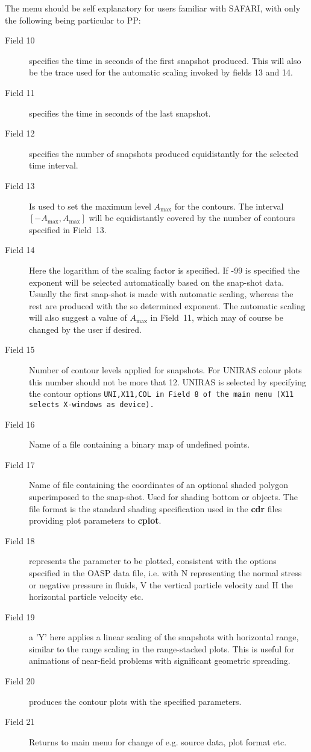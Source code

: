     The  menu should be self explanatory for users familiar  with 
SAFARI, with only the following being particular to PP: 
\begin{description}
\item[Field 10] specifies the time in seconds of the first snapshot
produced. This will also be the trace used for the automatic scaling
invoked by fields 13 and 14.
\item[Field 11] specifies the time in seconds of the last snapshot.
\item[Field 12] specifies the number of snapshots produced
equidistantly for the selected time interval.
\item[Field 13] Is used to set the maximum level $A_{\mbox{max}}$ for the
contours. The interval $[ -A_{\mbox{max}}, A_{\mbox{max}}]$ will be
equidistantly covered by the number of contours specified in Field~13.
\item[Field 14] Here the logarithm of the scaling factor is specified.
If -99 is specified the exponent will be selected automatically based on the
snap-shot data. Usually the first snap-shot is made with automatic
scaling, whereas the rest are produced with the so determined
exponent. The automatic scaling will also suggest a value of $A_{\mbox{max}}$ 
 in Field~11, which may of course be changed by the user if
desired.
\item[Field 15] Number of contour levels applied for snapshots. For
UNIRAS colour plots this number should not be more that 12. UNIRAS is
selected by specifying the contour options \tt UNI,X11,COL \rm in
Field~8 of the main menu (X11 selects X-windows as device).
\item[Field 16] Name of a file containing a binary map of undefined
points.
\item[Field 17] Name of file containing the coordinates of an optional
shaded polygon superimposed to the snap-shot. Used for shading bottom
or objects. The file format is the standard shading specification used
in the {\bf cdr} files providing plot parameters to {\bf cplot}.
\item[Field 18]  represents  the  parameter to be  plotted, consistent
with the options specified in the OASP data file, i.e.  with  N 
          representing the normal stress or negative pressure  in 
          fluids,  V  the vertical particle velocity  and  H  the 
          horizontal  particle  velocity etc.
\item[Field 19] a 'Y' here applies a linear scaling of the snapshots
          with horizontal range, similar to the range scaling in the
          range-stacked plots. This is useful for animations of
          near-field  problems with significant geometric spreading.
\item[Field 20] produces the contour plots with the specified parameters.
\item[Field 21] Returns to main menu for change of e.g. source data, 
          plot format etc. 
\end{description}


